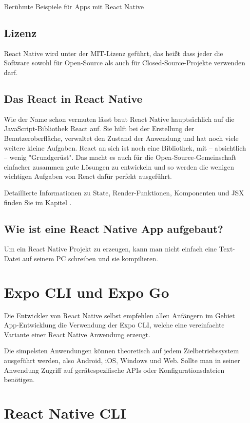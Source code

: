 \begin{center}
  Berühmte Beispiele für Apps mit React Native \cite{reactNativeShowcase}
\end{center}

\subsection{Lizenz}
React Native wird unter der MIT-Lizenz geführt, das heißt dass jeder die Software sowohl für
Open-Source als auch für Closed-Source-Projekte verwenden darf.

\subsection{Das React in React Native}
Wie der Name schon vermuten lässt baut React Native hauptsächlich auf die JavaScript-Bibliothek
React auf. Sie hilft bei der Erstellung der Benutzeroberfläche, verwaltet den Zustand der
Anwendung und hat noch viele weitere kleine Aufgaben. React an sich ist noch eine Bibliothek,
mit -- absichtlich -- wenig "Grundgerüst". Das macht es auch für die Open-Source-Gemeinschaft
einfacher zusammen gute Lösungen zu entwickeln und so werden die wenigen wichtigen Aufgaben von
React dafür perfekt ausgeführt.

Detaillierte Informationen zu State, Render-Funktionen, Komponenten und JSX finden Sie im Kapitel
.

\subsection{Wie ist eine React Native App aufgebaut?}
Um ein React Native Projekt zu erzeugen, kann man nicht einfach eine Text-Datei auf seinem PC
schreiben und sie kompilieren.



\section{Expo CLI und Expo Go}
Die Entwickler von React Native selbst empfehlen allen Anfängern im Gebiet App-Entwicklung die
Verwendung der Expo CLI, welche eine vereinfachte Variante einer React Native Anwendung erzeugt.

Die simpelsten Anwendungen können theoretisch auf jedem Zielbetriebssystem ausgeführt werden, also
Android, iOS, Windows und Web. Sollte man in seiner Anwendung Zugriff auf gerätespezifische APIs
oder Konfigurationsdateien benötigen.

\section{React Native CLI}